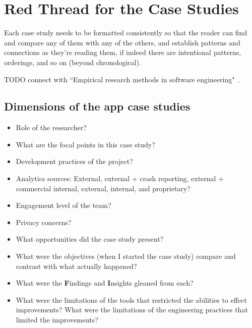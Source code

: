 \section{Red Thread for the Case Studies}
\label{section-case-studies-red-thread}

Each case study needs to be formatted consistently so that the reader can find and compare any of them with any of the others, and establish patterns and connections as they're reading them, if indeed there are intentional patterns, orderings, and so on (beyond chronological).


TODO connect with ``Empirical research methods in software engineering"~\citep{Wohlin2003_empirical_research_methods_in_software_engineering}.


\subsection{Dimensions of the app case studies}

\begin{itemize}
    \itemsep0em
    \item Role of the researcher?
    \item What are the focal points in this case study?
    \item Development practices of the project?
    \item Analytics sources: External, external + crash reporting, external + commercial internal, external, internal, and proprietary?
    \item Engagement level of the team?
    \item Privacy concerns?
    \item What opportunities did the case study present?
    \item What were the objectives (when I started the case study) compare and contrast with what actually happened? 
    \item What were the \textbf{F}indings and \textbf{I}nsights gleaned from each?
    \item What were the limitations of the tools that restricted the abilities to effect improvements? What were the limitations of the engineering practices that limited the improvements?
\end{itemize}


